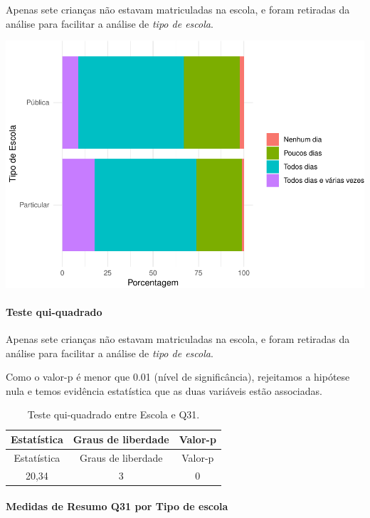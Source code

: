 \documentclass[]{article}
\let\oldparagraph\paragraph
\renewcommand{\paragraph}[1]{\oldparagraph{#1}\mbox{}}
\begin{document}
Apenas sete crianças não estavam matriculadas na escola, e foram retiradas da análise para facilitar a análise de \emph{tipo de escola}.

\begin{center}\includegraphics[width=0.75\linewidth]{relatorio_covid19_files/figure-latex/unnamed-chunk-1056-1} \end{center}

\hypertarget{teste-qui-quadrado-91}{%
\paragraph{Teste qui-quadrado}\label{teste-qui-quadrado-91}}

Apenas sete crianças não estavam matriculadas na escola, e foram retiradas da análise para facilitar a análise de \emph{tipo de escola}.

Como o valor-p é menor que 0.01 (nível de significância), rejeitamos a hipótese nula e temos evidência estatística que as duas variáveis estão associadas.

\begin{longtable}[]{@{}ccc@{}}
\caption{\label{tab:unnamed-chunk-1058}Teste qui-quadrado entre Escola e Q31.}\tabularnewline
\toprule
Estatística & Graus de liberdade & Valor-p\tabularnewline
\midrule
\endfirsthead
\toprule
Estatística & Graus de liberdade & Valor-p\tabularnewline
\midrule
\endhead
20,34 & 3 & 0\tabularnewline
\bottomrule
\end{longtable}

\cleardoublepage

\hypertarget{medidas-de-resumo-q31-por-tipo-de-escola}{%
\paragraph{Medidas de Resumo Q31 por Tipo de escola}\label{medidas-de-resumo-q31-por-tipo-de-escola}}
\end{document}
